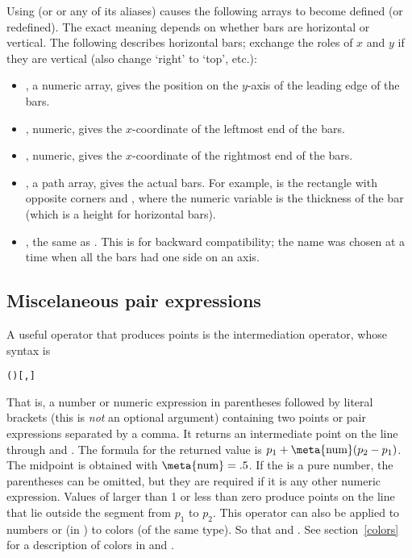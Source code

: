 \documentclass[letterpaper]{article}
\begin{document}
Using  (or  or any of its aliases) causes
the following arrays to become defined (or redefined). The exact meaning
depends on whether bars are horizontal or vertical. The following
describes horizontal bars; exchange the roles of $x$ and $y$ if they are
vertical (also change `right' to `top', etc.):
\begin{itemize}
  \item {}, a numeric array, gives the position on the
        $y$-axis of the leading edge of the bars.
  \item {}, numeric, gives the $x$-coordinate of the
        leftmost end of the bars.
  \item {}, numeric, gives the $x$-coordinate of the rightmost
        end of the bars.
  \item {}, a path array, gives the actual bars. For
        example,  is the rectangle with opposite corners
         and ,
        where the numeric variable  is the thickness of the
        bar (which is a height for horizontal bars).
  \item {}, the same as . This is for backward
        compatibility; the name was chosen at a time when all the bars
        had one side on an axis.
\end{itemize}

\subsection{Miscelaneous pair expressions}\label{pairexpressions}

A useful \MF{} operator that produces points is the intermediation
operator, whose syntax is
\begin{cd}
\texttt{()[,]}
\end{cd}
That is, a number or numeric expression in parentheses followed by
literal brackets (this is \emph{not} an optional argument) containing two points
or pair expressions separated by a comma. It returns an intermediate point on
the line through  and . The formula for the
returned value is $p_1 + \mbox{\meta{num}}(p_2 - p_1)$. The midpoint is
obtained with $\mbox{\meta{num}} = .5$. If the  is a pure
number, the parentheses can be omitted, but they are required if it is
any other numeric expression. Values of  larger than 1 or
less than zero produce points on the line that lie outside the segment
from $p_1$ to $p_2$. This operator can also be applied to numbers or (in
\MP{}) to colors (of the same type). So that  and
.  See section~\ref{colors} for a
description of colors in \MP{} and \MF{}.
\end{document}
